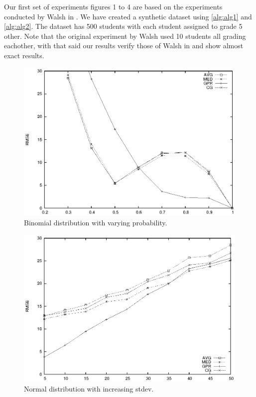\documentclass[a4paper]{article}
\begin{document}
Our first set of experiments figures 1 to 4 are based on the experiments conducted by Walsh in \cite{Walsh14a}. We have created a synthetic dataset using \ref{alg:alg1} and \ref{alg:alg2}. The dataset has 500 students with each student assigned to grade 5 other. Note that the original experiment by Walsh used 10 students all grading eachother, with that said our results verify those of Walsh in \cite{Walsh14a} and show almost exact results.
\begin{figure}[hb]
\centering
\includegraphics[width=1\textwidth]{figure01}
\caption{Binomial distribution with varying probability.}
\end{figure}

\newpage
\begin{figure}[H]
\centering
\includegraphics[width=1\textwidth]{figure02}
\caption{Normal distribution with increasing stdev.}
\end{figure}
\end{document}
